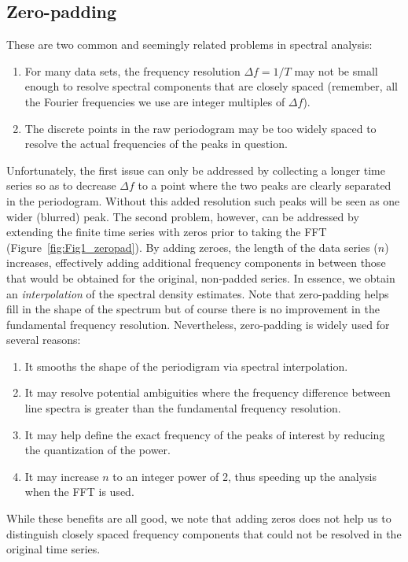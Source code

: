 \subsection{Zero-padding}
\label{sec:zeropad}
These are two common and seemingly related problems in spectral analysis:
\begin{enumerate}
	\item For many data sets, the frequency resolution $\Delta f = 1/T$ may not be small enough to resolve spectral
	components that are closely spaced (remember, all the Fourier frequencies we use are integer multiples of $\Delta f$).
	\item The discrete points in the raw periodogram may be too widely spaced to resolve the actual frequencies
	of the peaks in question.    
\end{enumerate}
Unfortunately, the first issue can only be addressed by collecting a longer time series so as to decrease $\Delta f$ to
a point where the two peaks are clearly separated in the periodogram.  Without this added resolution such peaks will
be seen as one wider (blurred) peak.  The second problem, however, can be addressed by
extending the finite time series with zeros prior to taking the FFT (Figure~\ref{fig:Fig1_zeropad}).  By adding zeroes, the length of the data
series ($n$) increases, effectively adding additional frequency components in between those that would be obtained for the
original, non-padded series.  In essence, we obtain an \emph{interpolation} of the spectral density estimates.  Note that
zero-padding helps fill in the shape of the spectrum but of course there is no improvement in the fundamental frequency resolution.
Nevertheless, zero-padding is widely used for several reasons:
\begin{enumerate}
	\item It smooths the shape of the periodigram via spectral interpolation.
	\item It may resolve potential ambiguities where the frequency difference between line spectra is greater
	than the fundamental frequency resolution.
	\item It may help define the exact frequency of the peaks of interest by reducing the quantization of the power.
	\item It may increase $n$ to an integer power of 2, thus speeding up the analysis when the FFT is used.
\end{enumerate}
While these benefits are all good, we note that adding zeros does not help us to distinguish closely spaced frequency components
that could not be resolved in the original time series.

